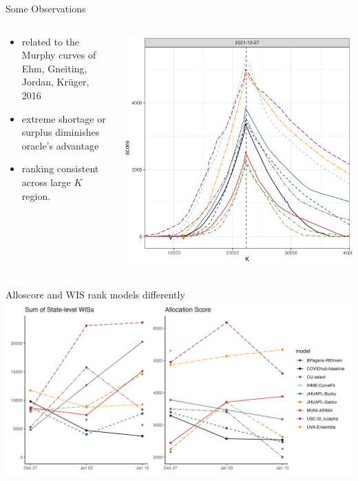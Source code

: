 \documentclass[
  9pt,
  ignorenonframetext,
]{beamer}
\begin{document}
\begin{frame}{Some Observations}
\protect\hypertarget{some-observations}{}
\begin{columns}[T]
\begin{column}{0.4\textwidth}
\begin{itemize}
\item
  related to the Murphy curves of Ehm, Gneiting, Jordan, Krüger, 2016
\item
  extreme shortage or surplus diminishes oracle's advantage
\item
  ranking consistent across large \(K\) region.
\end{itemize}
\end{column}

\begin{column}{0.6\textwidth}
\includegraphics{../plots/output/peak_alloscore_min.png}
\end{column}
\end{columns}
\end{frame}

\begin{frame}{Alloscore and WIS rank models differently}
\protect\hypertarget{alloscore-and-wis-rank-models-differently}{}
\includegraphics{../plots/output/p_wis_v_alloscore.png}
\end{frame}
\end{document}
